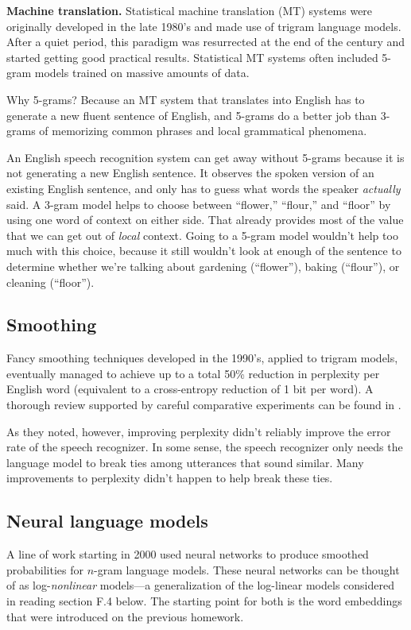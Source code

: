 \documentclass[12pt]{article}
\theoremstyle{plain}
\theoremstyle{definition}
\theoremstyle{remark}
\begin{document}
\textbf{Machine translation.} Statistical machine translation (MT) systems were originally developed in the late 1980’s and made use of trigram language models. After a quiet period, this paradigm was resurrected at the end of the century and started getting good practical results. Statistical MT systems often included 5-gram models trained on massive amounts of data.

Why 5-grams? Because an MT system that translates into English has to generate a new fluent sentence of English, and 5-grams do a better job than 3-grams of memorizing common phrases and local grammatical phenomena.

An English speech recognition system can get away without 5-grams because it is not generating a new English sentence. It observes the spoken version of an existing English sentence, and only has to guess what words the speaker \textit{actually} said. A 3-gram model helps to choose between “flower,” “flour,” and “floor” by using one word of context on either side. That already provides most of the value that we can get out of \textit{local} context. Going to a 5-gram model wouldn’t help too much with this choice, because it still wouldn’t look at enough of the sentence to determine whether we’re talking about gardening (“flower”), baking (“flour”), or cleaning (“floor”).

\subsection*{Smoothing}
Fancy smoothing techniques developed in the 1990’s, applied to trigram models, eventually managed to achieve up to a total 50\% reduction in perplexity per English word (equivalent to a cross-entropy reduction of 1 bit per word). A thorough review supported by careful comparative experiments can be found in \cite{Goodman2001}.

As they noted, however, improving perplexity didn’t reliably improve the error rate of the speech recognizer. In some sense, the speech recognizer only needs the language model to break ties among utterances that sound similar. Many improvements to perplexity didn’t happen to help break these ties.

\subsection*{Neural language models}
A line of work starting in 2000 used neural networks to produce smoothed probabilities for $n$-gram language models. These neural networks can be thought of as log-\textit{nonlinear} models—a generalization of the log-linear models considered in reading section F.4 below. The starting point for both is the word embeddings that were introduced on the previous homework.
\end{document}
